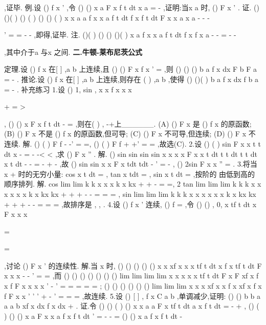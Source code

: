 \int 
\int 
\int 
\int 
\int 
,证毕. 
\textcolor{lyred}{例}.设
()
f
x
'
\ge 
,令
()
()
x
a
F x
f t dt
x
a
=
-\int 
,证明:当x
a
\neq 
时,
()
F
x
'
\ge 
. 
证.
()
()(
)
()
(
)
()
()
(
)
x
x
a
a
f x
x
a
f t dt
f x
f t
dt
F
x
x
a
x
a
-
-
-




'
=
=
-
-
\int 
\int 
,即得,证毕. 
\textcolor{lyred}{注}.
()(
)
()
()
()(
)
x
a
f x
x
a
f t dt
f x
f
x
a
\psi 
-
-
=
-
-




\int 
,其中\psi 介于a 与x 之间. 
\vspace{4pt}
{\bfseries \textcolor{lyred}{二.牛顿-莱布尼茨公式}}

\textcolor{lyred}{定理}.设
()
f x 在[
]
,a b 上连续,且
()
()
F
x
f x
'
=
,则
()
()
()
b
a
f x dx
F b
F a
=
-
\int 
. 
\textcolor{lyred}{推论}.设
()
f x 在[
]
,a b 上连续,则存在
(
)
,a b
\psi \in 
,使得
()
()(
)
b
a
f x dx
f
b
a
\psi 
=
-
\int 
. 
\textcolor{lyred}{补充练习 }
1.设
()
1,
sin ,
x
x
f x
x
x

+
\le 
=
>

,
()
()
x
F x
f t dt
-
=\int 
,则在(
)
,
-\infty +\infty 上______. 
(A)
()
F x 是
()
f x 的原函数;  (B)
()
F x 不是
()
f x 的原函数,但可导; 
(C)
()
F x 不可导,但连续;    (D)
()
F x 不连续. 
解.
()
(
)
F
f
-
-'
=
=,
()
(
)
F
f
+
+'
=
=
,故选(C). 
2.设
()
(
)
sin
F x
x
t
t dt
x
-
=
-
-<
<
\int 
,求
()
F
x
''
. 
解.
()
sin
sin
sin
sin
x
x
x
x
F x
x
t dt
t
t dt
t
t dt
x
t dt
-
-
=
-
+
-
\int 
\int 
\int 
\int 
,故 
()
sin
sin
x
x
F
x
tdt
tdt
-
'
=
-
\int 
\int 
,
()
2sin
F
x
x
''
=
. 
3.将当
x
+
\to 
时的无穷小量:
cos
x
t dt
\alpha =\int 
,
tan
x
tdt
\beta =\int 
,
sin
x
t dt
\gamma =\int 
,按阶的 
由低到高的顺序排列. 
解.
cos
lim
lim
k
k
x
x
x
k
x
kx
\alpha 
+
+
-
\to 
\to 
=
\Rightarrow 
=,
2 tan
lim
lim
lim
k
k
k
x
x
x
x
x
x
k
x
kx
kx
\beta 
+
+
+
-
-
\to 
\to 
\to 
=
=
\Rightarrow 
=
, 
sin
lim
lim
lim
k
k
k
x
x
x
x
x
x
k
x
kx
kx
\gamma 
+
+
+
-
-
\to 
\to 
\to 
=
=
\Rightarrow 
=
,故排序是
, ,
\alpha \gamma \beta . 
4.设
()
f
x
'
连续,
()
f
=
,令
()
()
,
0,
x
tf t dt
x
F x
x
x

\neq 

=

=

\int 
,讨论
()
F
x
'
的连续性. 
解.当
x \neq 
时,
()
()
()
()
()
x
x
xf x
x
x
tf t dt
x f x
tf t dt
F
x
x
x
\cdots 
-
\cdots 
-
'
=
=
\int 
\int 
,而 
()
()
()
()
()
()
()
lim
lim
lim
lim
x
x
x
x
x
tf t dt
F x
F
xf x
f x
f
F
x
x
x
x
\to 
\to 
\to 
\to 
'
-
'
=
=
=
=
=
\int 
; 
()
()
()
()
()
()
lim
lim
lim
x
x
x
xf x
x f
x
xf x
f
x
f
F
x
x
\to 
\to 
\to 
'
'
'
+
-
'
=
=
=
,故连续. 
5.设
()
[
]
,
f
x
C a b
\in 
,单调减少,证明:
()
()
b
b
a
a
a
b
xf
x dx
f
x dx
+
\le 
\int 
\int 
. 
证.令
()
()
(
)
()
x
x
a
a
F x
tf t dt
a
x
f t dt
=
-
+
\int 
\int 
,
()
(
)
()
()
x
a
F
x
x
a f x
f t dt
'
=
-
-
=
\int 
()
()
x
a
f x
f t
dt
-
\le 




